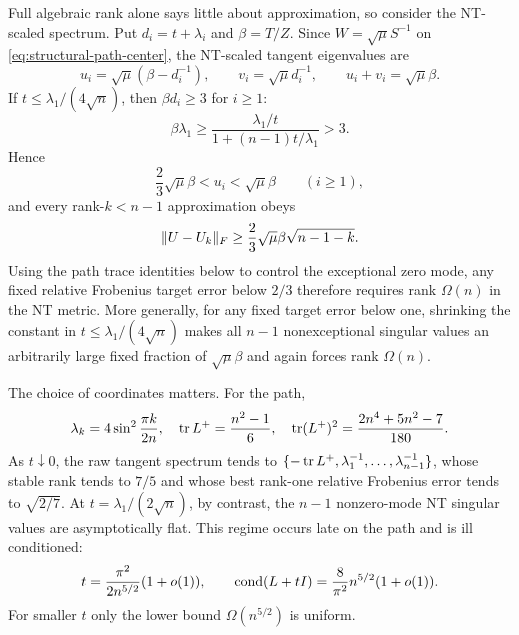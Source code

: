 Full algebraic rank alone says little about approximation, so consider the
NT-scaled spectrum.  Put
$d_i=t+\lambda_i$ and $\beta=T/Z$.  Since
$W=\sqrt\mu S^{-1}$ on \eqref{eq:structural-path-center}, the NT-scaled
tangent eigenvalues are
\begin{equation}
 u_i=\sqrt\mu\left(\beta-d_i^{-1}\right),\qquad
 v_i=\sqrt\mu d_i^{-1},\qquad u_i+v_i=\sqrt\mu\beta.
                                                               \label{eq:structural-path-nt-spectrum}
\end{equation}
If $t\leq\lambda_1/(4\sqrt n)$, then $\beta d_i\geq3$ for $i\geq1$:
\[
 \beta\lambda_1
 \geq\frac{\lambda_1/t}{1+(n-1)t/\lambda_1}>3.
\]
Hence
\begin{equation}
 \frac23\sqrt\mu\beta<u_i<\sqrt\mu\beta\qquad(i\geq1),
                                                               \label{eq:structural-path-flat}
\end{equation}
and every rank-$k<n-1$ approximation obeys
\begin{equation}
 \lVert U-U_k\rVert_F\geq\frac23\sqrt\mu\beta\sqrt{n-1-k}.
                                                               \label{eq:structural-path-approx-rank}
\end{equation}
Using the path trace identities below to control the exceptional zero mode,
any fixed relative Frobenius target error below $2/3$ therefore requires
rank $\Omega(n)$ in the NT metric.  More generally, for any fixed target
error below one, shrinking the constant in
$t\leq\lambda_1/(4\sqrt n)$ makes all $n-1$ nonexceptional singular values
an arbitrarily large fixed fraction of $\sqrt\mu\beta$ and again forces
rank $\Omega(n)$.

The choice of coordinates matters.  For the path,
\begin{equation}
 \lambda_k=4\sin^2\frac{\pi k}{2n},\quad
 \operatorname{tr} L^+=\frac{n^2-1}{6},\quad
 \operatorname{tr}(L^+)^2=\frac{2n^4+5n^2-7}{180}.                    \label{eq:structural-path-traces}
\end{equation}
As $t\downarrow0$, the raw tangent spectrum tends to
$\{-\operatorname{tr} L^+,\lambda_1^{-1},\ldots,\lambda_{n-1}^{-1}\}$, whose stable rank
tends to $7/5$ and whose best rank-one relative Frobenius error tends to
$\sqrt{2/7}$.  At $t=\lambda_1/(2\sqrt n)$, by contrast, the $n-1$
nonzero-mode NT singular values are asymptotically flat.  This regime occurs
late on the path and is ill conditioned:
\begin{equation}
 t=\frac{\pi^2}{2n^{5/2}}(1+o(1)),\qquad
 \operatorname{cond}(L+tI)=\frac8{\pi^2}n^{5/2}(1+o(1)).               \label{eq:structural-path-late}
\end{equation}
For smaller $t$ only the lower bound $\Omega(n^{5/2})$ is uniform.

